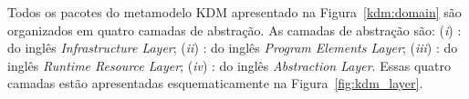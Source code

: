 Todos os pacotes do metamodelo KDM apresentado na Figura~\ref{kdm:domain} são organizados em quatro camadas de abstração. As camadas de abstração são: (\textit{i}) : do inglês \textit{Infrastructure Layer}; (\textit{ii}) : do inglês \textit{Program Elements Layer}; (\textit{iii}) : do inglês \textit{Runtime Resource Layer}; (\textit{iv}) : do inglês \textit{Abstraction Layer}. Essas quatro camadas estão apresentadas esquematicamente na Figura~\ref{fig:kdm_layer}.





